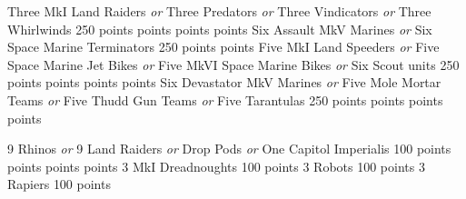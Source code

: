 \documentclass[a4paper, twocolumn]{article}
\begin{document}
		{Three MkI Land Raiders \newline\emph{or} Three Predators \newline\emph{or} Three Vindicators \newline\emph{or} Three Whirlwinds}
		{250 points points points points}
		{Six Assault MkV Marines \newline \emph{or} Six Space Marine Terminators}
        {250 points  points}
		{Five MkI Land Speeders \newline \emph{or} Five Space Marine Jet Bikes \newline \emph{or} Five MkVI Space Marine Bikes \newline \emph{or} Six Scout units}
        {250 points  points  points  points}
		{Six Devastator MkV Marines \newline \emph{or} Five Mole Mortar Teams \newline \emph{or} Five Thudd Gun Teams \newline \emph{or} Five Tarantulas}
        {250 points  points  points  points}
\upgradesEND

		{9 Rhinos \newline \emph{or} 9 Land Raiders \newline \emph{or} Drop Pods \newline \emph{or} One Capitol Imperialis}
        {100 points  points  points  points}
		{3 MkI Dreadnoughts}
        {100 points}
		{3 Robots}
        {100 points}
		{3 Rapiers}
        {100 points}
\upgradesEND

\upgradesEND

\twocolumn			%
\end{document}
